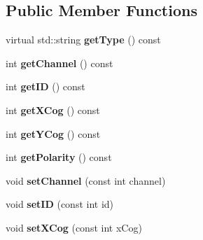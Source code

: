 \subsection*{Public Member Functions}
\begin{DoxyCompactItemize}
\item 
\hypertarget{classemorph_1_1ClusterEvent_a122c9c8d5c0fd44f011781585436347a}{virtual std\-::string {\bfseries get\-Type} () const }\label{classemorph_1_1ClusterEvent_a122c9c8d5c0fd44f011781585436347a}

\item 
\hypertarget{classemorph_1_1ClusterEvent_af2f6343d948ad071557d5d59f856d4a7}{int {\bfseries get\-Channel} () const }\label{classemorph_1_1ClusterEvent_af2f6343d948ad071557d5d59f856d4a7}

\item 
\hypertarget{classemorph_1_1ClusterEvent_ae8e282dd4aad4b3d6bc38105abd40eb7}{int {\bfseries get\-I\-D} () const }\label{classemorph_1_1ClusterEvent_ae8e282dd4aad4b3d6bc38105abd40eb7}

\item 
\hypertarget{classemorph_1_1ClusterEvent_a89a9ea0163e44f3f50bc15d23d63b3e6}{int {\bfseries get\-X\-Cog} () const }\label{classemorph_1_1ClusterEvent_a89a9ea0163e44f3f50bc15d23d63b3e6}

\item 
\hypertarget{classemorph_1_1ClusterEvent_aec7421372a0150f41b5a6d8bea678a9c}{int {\bfseries get\-Y\-Cog} () const }\label{classemorph_1_1ClusterEvent_aec7421372a0150f41b5a6d8bea678a9c}

\item 
\hypertarget{classemorph_1_1ClusterEvent_aef47e3ab7bfa024b0ea2e66db9c2f48c}{int {\bfseries get\-Polarity} () const }\label{classemorph_1_1ClusterEvent_aef47e3ab7bfa024b0ea2e66db9c2f48c}

\item 
\hypertarget{classemorph_1_1ClusterEvent_a874dd16064761c66c8cd1dcf04c4ee85}{void {\bfseries set\-Channel} (const int channel)}\label{classemorph_1_1ClusterEvent_a874dd16064761c66c8cd1dcf04c4ee85}

\item 
\hypertarget{classemorph_1_1ClusterEvent_a1a29ac36deec29ee952ba19e2067d163}{void {\bfseries set\-I\-D} (const int id)}\label{classemorph_1_1ClusterEvent_a1a29ac36deec29ee952ba19e2067d163}

\item 
\hypertarget{classemorph_1_1ClusterEvent_ab08f800c0e9e411b60b980d437328ac1}{void {\bfseries set\-X\-Cog} (const int x\-Cog)}\label{classemorph_1_1ClusterEvent_ab08f800c0e9e411b60b980d437328ac1}


\end{DoxyCompactItemize}
